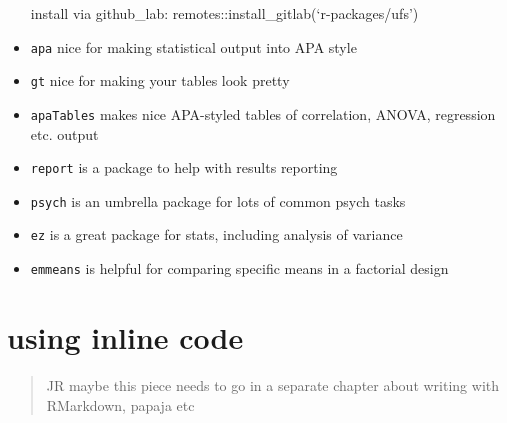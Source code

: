 \documentclass[
  letterpaper,
  DIV=11,
  numbers=noendperiod]{scrreprt}
\begin{document}
\begin{itemize}
  install via github\_lab: remotes::install\_gitlab(`r-packages/ufs')
\item
  \texttt{apa} nice for making statistical output into APA style
\item
  \texttt{gt} nice for making your tables look pretty
\item
  \texttt{apaTables} makes nice APA-styled tables of correlation, ANOVA,
  regression etc. output
\item
  \texttt{report} is a package to help with results reporting
\item
  \texttt{psych} is an umbrella package for lots of common psych tasks
\item
  \texttt{ez} is a great package for stats, including analysis of
  variance
\item
  \texttt{emmeans} is helpful for comparing specific means in a
  factorial design
\end{itemize}


\chapter{using inline code}\label{using-inline-code}

\begin{quote}
JR maybe this piece needs to go in a separate chapter about writing with
RMarkdown, papaja etc
\end{quote}
\end{document}
